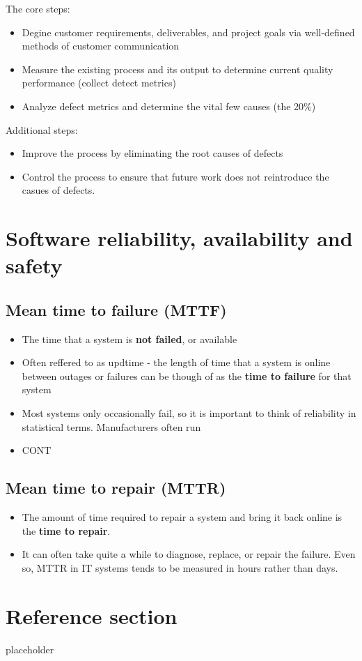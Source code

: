 \documentclass{article}
\begin{document}
\begin{flushleft}
The core steps:
\begin{itemize}
  \item Degine customer requirements, deliverables, and project goals via well-defined methods of customer communication
  \item Measure the existing process and its output to determine current quality performance (collect detect metrics)
  \item Analyze defect metrics and determine the vital  few causes (the 20\%)
\end{itemize}
Additional steps:
\begin{itemize}
  \item Improve the process by eliminating the root causes of defects
  \item Control the process to ensure that future work does not reintroduce the casues of defects.
\end{itemize}
\end{flushleft}

\section{Software reliability, availability and safety}

\subsection{Mean time to failure (MTTF)}

\begin{itemize}
  \item The time that a system is \textbf{not failed}, or available
  \item Often reffered to as updtime - the length of time that a system is online between outages or failures can be though of as the \textbf{time to failure} for that system
  \item Most systems only occasionally fail, so it is important to think of reliability in statistical terms. Manufacturers often run 
  \item CONT 
\end{itemize}

\subsection{Mean time to repair (MTTR)}
\begin{itemize}
  \item The amount of time required to repair a system and bring it back online is the \textbf{time to repair}.
  \item It can often take quite a while to diagnose, replace, or repair the failure. Even so, MTTR in IT systems tends to be measured in hours rather than days.
\end{itemize}

\pagebreak
\section*{Reference section} \label{sec:reference}
\begin{description}
	\item[placeholder] \hfill \\
\end{description}
\end{document}
